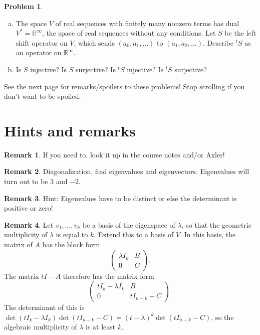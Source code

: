 \documentclass[11pt,oneside]{amsart}
\theoremstyle{definition}
\newtheorem{problem}{Problem}
\newtheorem{remark}{Remark}
\newcommand{\bR}{\mathbb{R}}
\begin{document}
    \begin{problem}
        \leavevmode\begin{enumerate}[(a)]
            \item The space $V$ of real sequences with finitely many nonzero terms has dual $V^*=\bR^\infty$, the space of real sequences without any conditions. Let $S$ be the left shift operator on $V$, which sends $(a_0,a_1,\dots)$ to $(a_1,a_2,\dots)$. Describe $^tS$ as an operator on $\bR^\infty$.
            \item Is $S$ injective? Is $S$ surjective? Is $^tS$ injective? Is $^tS$ surjective?
        \end{enumerate}
    \end{problem}

    \bigskip
    See the next page for remarks/spoilers to these problems! Stop scrolling if you don't want to be spoiled.

    \newpage

    \section{Hints and remarks}

    \begin{remark}
        If you need to, look it up in the course notes and/or Axler!
    \end{remark}
    
    \begin{remark}
        Diagonalization, find eigenvalues and eigenvectors. Eigenvalues will turn out to be 3 and $-2$.
    \end{remark}

    \begin{remark}
        Hint: Eigenvalues have to be distinct or else the determinant is positive or zero!
    \end{remark}
    
    \begin{remark}
        Let $v_1,\dots,v_k$ be a basis of the eigenspace of $\lambda$, so that the geometric multiplicity of $\lambda$ is equal to $k$. Extend this to a basis of $V$. In this basis, the matrix of $A$ has the block form
        \[\begin{pmatrix}
            \lambda I_k&B\\
            0&C
        \end{pmatrix}.\]
        The matrix $tI-A$ therefore has the matrix form
        \[\begin{pmatrix}
            tI_k-\lambda I_k & B\\
            0 & tI_{n-k}-C
        \end{pmatrix}.\]
        The determinant of this is $\det(tI_k-\lambda I_k)\det(tI_{n-k}-C)=(t-\lambda)^k\det(tI_{n-k}-C)$, so the algebraic multiplicity of $\lambda$ is at least $k$.
    \end{remark}
\end{document}
